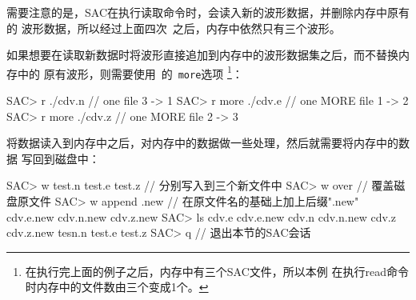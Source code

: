 需要注意的是，SAC在执行读取命令时，会读入新的波形数据，并删除内存中原有的
波形数据，所以经过上面四次~之后，内存中依然只有三个波形。

如果想要在读取新数据时将波形直接追加到内存中的波形数据集之后，而不替换内存中的
原有波形，则需要使用~的~\verb+more+选项
\footnote{在执行完上面的例子之后，内存中有三个SAC文件，所以本例
在执行read命令时内存中的文件数由三个变成1个。}：
\begin{SACCode}
SAC> r ./cdv.n              // one file       3 -> 1
SAC> r more ./cdv.e         // one MORE file  1 -> 2
SAC> r more ./cdv.z         // one MORE file  2 -> 3
\end{SACCode}

将数据读入到内存中之后，对内存中的数据做一些处理，然后就需要将内存中的数据
写回到磁盘中：
\begin{SACCode}
SAC> w test.n test.e test.z         // 分别写入到三个新文件中
SAC> w over                         // 覆盖磁盘原文件
SAC> w append .new                  // 在原文件名的基础上加上后缀".new"
cdv.e.new cdv.n.new cdv.z.new
SAC> ls
cdv.e cdv.e.new cdv.n cdv.n.new cdv.z cdv.z.new tesn.n test.e test.z
SAC> q                              // 退出本节的SAC会话
\end{SACCode}
